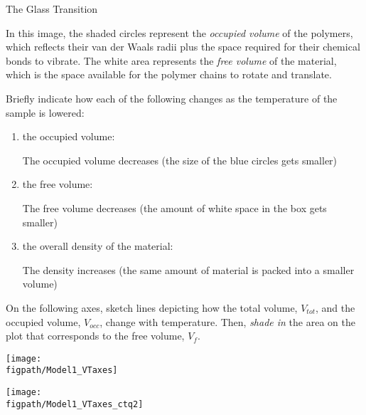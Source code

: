 \begin{activity}{The Glass Transition}
\begin{model}
	In this image, the shaded circles represent the \textit{occupied volume} of the polymers, which reflects their van der Waals radii plus the space required for their chemical bonds to vibrate.  The white area represents the \emph{free volume} of the material, which is the space available for the polymer chains to rotate and translate.
	
\end{model}


\begin{ctqs}

	\question Briefly indicate how each of the following changes as the temperature of the sample is lowered:
	
		\begin{enumerate}
		
			\item the occupied volume:
			
				\begin{solution}[0.25in]{}
					The occupied volume decreases (the size of the blue circles gets smaller)
				\end{solution}
			
			\item the free volume:
			
				\begin{solution}[0.25in]{}
					The free volume decreases (the amount of white space in the box gets smaller)
				\end{solution}
			
			\item the overall density of the material:
			
				\begin{solution}[0.25in]{}
					The density increases (the same amount of material is packed into a smaller volume)
				\end{solution}
			
		\end{enumerate}
		
	\question On the following axes, sketch lines depicting how the total volume, $V_{tot}$, and the occupied volume, $V_{occ}$, change with temperature.  Then, \emph{shade in} the area on the plot that corresponds to the free volume, $V_f$. \label{\labelbase:ctq:VTplot1}
	
		\vspace{0.25in}
		\begin{solution}[1.5in]{
			\centerline{\texttt{[image: \\figpath/Model1\_VTaxes]}}
		}
			\centerline{\texttt{[image: \\figpath/Model1\_VTaxes\_ctq2]}}
		\end{solution}
		

\end{ctqs}
\end{activity}
